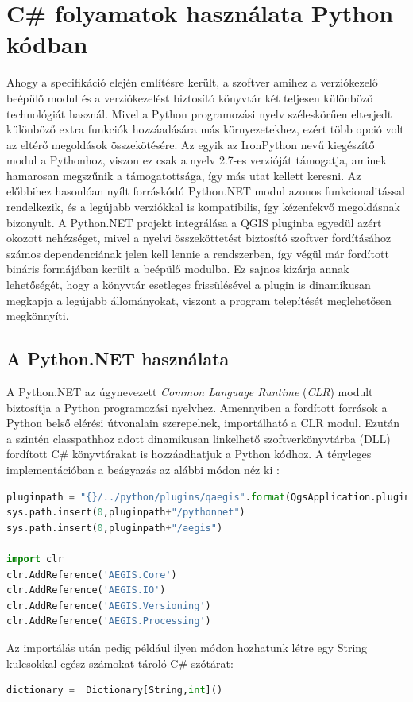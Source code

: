 \section{C\# folyamatok használata Python kódban}
Ahogy a specifikáció elején említésre került, a szoftver amihez a verziókezelő beépülő modul és a verziókezelést biztosító könyvtár két teljesen különböző technológiát használ. Mivel a Python programozási nyelv széleskörűen elterjedt különböző extra funkciók hozzáadására más környezetekhez, ezért több opció volt az eltérő megoldások összekötésére. Az egyik az IronPython nevű kiegészítő modul a Pythonhoz, viszon ez csak a nyelv 2.7-es verzióját támogatja, aminek hamarosan megszűnik a támogatottsága, így más utat kellett keresni. Az előbbihez hasonlóan nyílt forráskódú Python.NET modul azonos funkcionalitással rendelkezik, és a legújabb verziókkal is kompatibilis, így kézenfekvő megoldásnak bizonyult. A Python.NET projekt integrálása a QGIS pluginba egyedül azért okozott nehézséget, mivel a nyelvi összeköttetést biztosító szoftver fordításához számos dependenciának jelen kell lennie a rendszerben, így végül már fordított bináris formájában került a beépülő modulba. Ez sajnos kizárja annak lehetőségét, hogy a könyvtár esetleges frissülésével a plugin is dinamikusan megkapja a legújabb állományokat, viszont a program telepítését meglehetősen megkönnyíti.
\subsection{A Python.NET használata}
A Python.NET az úgynevezett \emph{Common Language Runtime} (\emph{CLR}) modult biztosítja a Python programozási nyelvhez. Amennyiben a fordított források a Python belső elérési útvonalain szerepelnek, importálható a CLR modul. Ezután a szintén classpathhoz adott dinamikusan linkelhető szoftverkönyvtárba (DLL) fordított C\# könyvtárakat is hozzáadhatjuk a Python kódhoz. A tényleges implementációban a beágyazás az alábbi módon néz ki :
\begin{lstlisting}[language={python}]
pluginpath = "{}/../python/plugins/qaegis".format(QgsApplication.pluginPath())
sys.path.insert(0,pluginpath+"/pythonnet")
sys.path.insert(0,pluginpath+"/aegis")

import clr
clr.AddReference('AEGIS.Core')
clr.AddReference('AEGIS.IO')
clr.AddReference('AEGIS.Versioning')
clr.AddReference('AEGIS.Processing')
\end{lstlisting}
Az importálás után pedig például ilyen módon hozhatunk létre egy String kulcsokkal egész számokat tároló C\# szótárat:
\begin{lstlisting}[language={python}]
dictionary =  Dictionary[String,int]()
\end{lstlisting}

